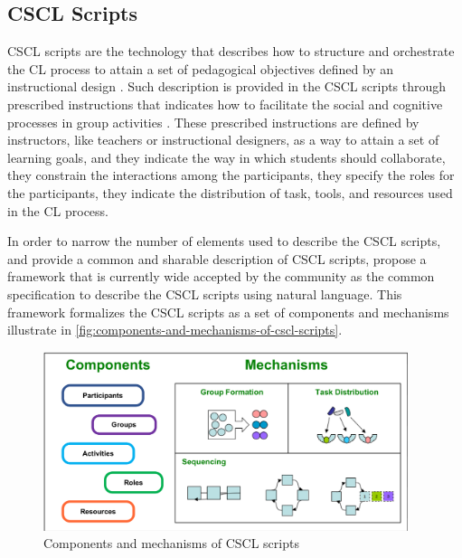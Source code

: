 \subsection{CSCL Scripts}
\label{sec:cscl-scripts}

CSCL scripts are the technology that describes how to structure and orchestrate the CL process to attain a set of pedagogical objectives defined by an instructional design \cite{DillenbourgJermann2007}. Such description is provided in the CSCL scripts through prescribed instructions that indicates how to facilitate the social and cognitive processes in group activities \cite{Dillenbourg2002}. These prescribed instructions are defined by instructors, like teachers or instructional designers, as a way to attain a set of learning goals, and they indicate the way in which students should collaborate, they constrain the interactions among the participants, they specify the roles for the participants, they indicate the distribution of task, tools, and resources used in the CL process.

In order to narrow the number of elements used to describe the CSCL scripts, and provide a common and sharable description of CSCL scripts,  propose a framework that is currently wide accepted by the community as the common specification to describe the CSCL scripts using natural language. This framework formalizes the CSCL scripts as a set of components and mechanisms illustrate in \autoref{fig:components-and-mechanisms-of-cscl-scripts}.


\begin{figure}[htb]
 \caption{Components and mechanisms of CSCL scripts}
 \label{fig:components-and-mechanisms-of-cscl-scripts}
 \centering
 \includegraphics[width=0.95\textwidth]{images/components-and-mechanisms-of-cscl-scripts}
\end{figure}

